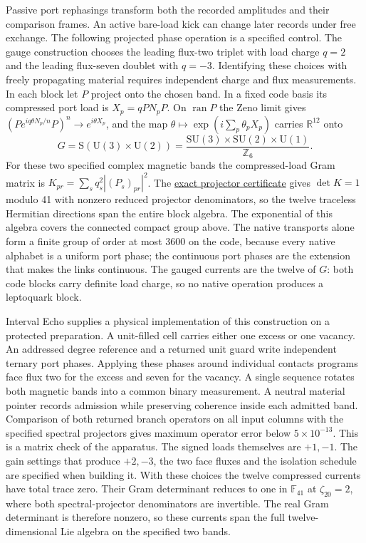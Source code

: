 \documentclass[11pt]{article}
\begin{document}
Passive port rephasings transform both the recorded amplitudes and their
comparison frames. An active bare-load kick can change later records under
free exchange. The following projected phase operation is a specified control.
The gauge construction chooses the leading flux-two triplet with load charge
\(q=2\) and the leading flux-seven doublet with \(q=-3\). Identifying these
choices with freely propagating material requires independent charge and flux
measurements. In each block let \(P\) project onto the chosen band. In a fixed
code basis its compressed port load is \(X_p=qPN_pP\). On \(\operatorname{ran}P\)
the Zeno limit gives \((Pe^{iq\theta N_p/n}P)^n\to e^{i\theta X_p}\), and the map
\(\theta\mapsto\exp(i\sum_p\theta_pX_p)\) carries \(\mathbb R^{12}\) onto
\[
 G=\mathrm S(\mathrm U(3)\times\mathrm U(2))
 =\frac{\mathrm{SU}(3)\times\mathrm{SU}(2)\times\mathrm U(1)}{\mathbb Z_6}.
\]
For these two specified complex magnetic bands the compressed-load Gram
matrix is $K_{pr}=\sum_s q_s^2 |(P_s)_{pr}|^2$. The
\href{https://github.com/FloatingPragma/observer-patch-holography/blob/c2ba2faeaaf23fac1763c1bc925c8626b77d3bb9/model/experiments/interval_echo_gauge/port_phases/exact_bands.py}{exact projector certificate}
gives $\det K=1$ modulo 41 with nonzero reduced projector denominators, so
the twelve traceless Hermitian directions span the entire block algebra.
The exponential of this algebra covers the connected compact group above.
The native transports
alone form a finite group of order at most \(3600\) on the code, because every native
alphabet is a uniform port phase; the continuous port phases are the extension that
makes the links continuous. The gauged currents are the twelve of \(G\): both code
blocks carry definite load charge, so no native operation produces a leptoquark block.

Interval Echo supplies a physical implementation of this construction on a
protected preparation. A unit-filled cell carries either one excess or one
vacancy. An addressed degree reference and a returned unit guard write
independent ternary port phases. Applying these phases around individual
contacts programs face flux two for the excess and seven for the vacancy.
A single sequence rotates both magnetic bands into a common binary
measurement. A neutral material pointer records admission while preserving
coherence inside each admitted band. Comparison of both returned branch
operators on all input columns with the specified spectral projectors gives
maximum operator error below \(5\times10^{-13}\). This is a matrix check of
the apparatus. The signed loads themselves are \(+1,-1\). The gain settings
that produce \(+2,-3\), the two face fluxes and the isolation schedule are
specified when building it. With these choices the twelve compressed
currents have total trace zero. Their Gram determinant reduces to one in
\(\mathbb F_{41}\) at \(\zeta_{20}=2\), where both spectral-projector
denominators are invertible. The real Gram determinant is therefore nonzero,
so these currents span the full twelve-dimensional Lie algebra on the
specified two bands.
\end{document}
